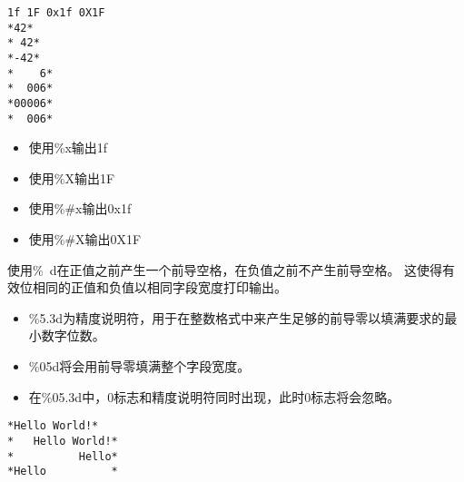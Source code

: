 \begin{frame}\ft{\secname}
      
\end{frame}

\begin{frame}[fragile]\ft{\secname}
\begin{lstlisting}[showspaces=true,backgroundcolor=\color{red!20}]
1f 1F 0x1f 0X1F
*42*
* 42*
*-42*
*    6*
*  006*
*00006*
*  006*
\end{lstlisting}
\end{frame}


\begin{frame}[fragile] 

\begin{itemize}
\item \tf 使用\%x输出1f
\item 使用\%X输出1F
\item 使用\%\#x输出0x1f
\item 使用\%\#X输出0X1F
\end{itemize}
\end{frame}

\begin{frame}[fragile] 
\tf 使用\%~d在正值之前产生一个前导空格，在负值之前不产生前导空格。
这使得有效位相同的正值和负值以相同字段宽度打印输出。
\end{frame}

\begin{frame}[fragile] 
\begin{itemize}
\item\tf \%5.3d为精度说明符，用于在整数格式中来产生足够的前导零以填满要求的最小数字位数。\\[0.1in]
\item \%05d将会用前导零填满整个字段宽度。\\[0.1in]
\item 在\%05.3d中，0标志和精度说明符同时出现，此时0标志将会忽略。
\end{itemize}
\end{frame}

\begin{frame}[fragile]
    
\end{frame}

\begin{frame}[fragile]
\begin{lstlisting}[showspaces=true,backgroundcolor=\color{red!20}]
*Hello World!*
*   Hello World!*
*          Hello*
*Hello          *
\end{lstlisting}
\end{frame}

